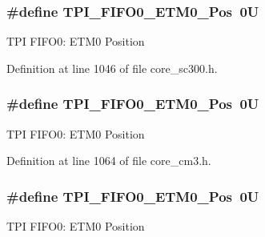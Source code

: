 \subsubsection[{\texorpdfstring{T\+P\+I\+\_\+\+F\+I\+F\+O0\+\_\+\+E\+T\+M0\+\_\+\+Pos}{TPI_FIFO0_ETM0_Pos}}]{\setlength{\rightskip}{0pt plus 5cm}\#define T\+P\+I\+\_\+\+F\+I\+F\+O0\+\_\+\+E\+T\+M0\+\_\+\+Pos~0U}\hypertarget{group___c_m_s_i_s___t_p_i_ga48783ce3c695d8c06b1352a526110a87}{}\label{group___c_m_s_i_s___t_p_i_ga48783ce3c695d8c06b1352a526110a87}
T\+PI F\+I\+F\+O0\+: E\+T\+M0 Position 

Definition at line 1046 of file core\+\_\+sc300.\+h.

\subsubsection[{\texorpdfstring{T\+P\+I\+\_\+\+F\+I\+F\+O0\+\_\+\+E\+T\+M0\+\_\+\+Pos}{TPI_FIFO0_ETM0_Pos}}]{\setlength{\rightskip}{0pt plus 5cm}\#define T\+P\+I\+\_\+\+F\+I\+F\+O0\+\_\+\+E\+T\+M0\+\_\+\+Pos~0U}\hypertarget{group___c_m_s_i_s___t_p_i_ga48783ce3c695d8c06b1352a526110a87}{}\label{group___c_m_s_i_s___t_p_i_ga48783ce3c695d8c06b1352a526110a87}
T\+PI F\+I\+F\+O0\+: E\+T\+M0 Position 

Definition at line 1064 of file core\+\_\+cm3.\+h.

\subsubsection[{\texorpdfstring{T\+P\+I\+\_\+\+F\+I\+F\+O0\+\_\+\+E\+T\+M0\+\_\+\+Pos}{TPI_FIFO0_ETM0_Pos}}]{\setlength{\rightskip}{0pt plus 5cm}\#define T\+P\+I\+\_\+\+F\+I\+F\+O0\+\_\+\+E\+T\+M0\+\_\+\+Pos~0U}\hypertarget{group___c_m_s_i_s___t_p_i_ga48783ce3c695d8c06b1352a526110a87}{}\label{group___c_m_s_i_s___t_p_i_ga48783ce3c695d8c06b1352a526110a87}
T\+PI F\+I\+F\+O0\+: E\+T\+M0 Position 

